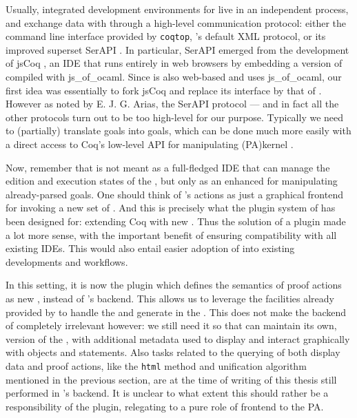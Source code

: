 Usually, integrated development environments for  live in an independent
process, and exchange data with  through a high-level communication protocol:
either the command line interface provided by \texttt{coqtop}, 's default XML
protocol, or its improved superset SerAPI .
In particular, SerAPI emerged from the development of jsCoq
, an IDE that runs entirely in web browsers by
embedding a version of  compiled with js\_of\_ocaml. Since  is also
web-based and uses js\_of\_ocaml, our first idea was essentially to fork jsCoq
and replace its interface by that of . However as noted by E. J. G. Arias,
the SerAPI protocol --- and in fact all the other protocols turn out to be too
high-level for our purpose. Typically we need to (partially) translate  goals
into  goals, which can be done much more easily with a direct access to
Coq's low-level API for manipulating \kl(PA){kernel} .

Now, remember that  is not meant as a full-fledged IDE that can manage the
edition and execution states of the , but only as an enhanced  for manipulating already-parsed goals. One should think of 's actions
as just a graphical frontend for invoking a new set of . And this is
precisely what the plugin system of  has been designed for: extending Coq
with new . Thus the solution of a  plugin made a lot more sense, with
the important benefit of ensuring compatibility with all existing IDEs. This
would also entail easier adoption of  into existing  developments and
workflows.

In this setting, it is now the  plugin which defines the semantics of proof
actions as new , instead of 's backend. This allows us to leverage
the facilities already provided by  to handle the  and generate
 in the . This does not
make the backend of  completely irrelevant however: we still need it so
that  can maintain its own,  version of the ,
with additional metadata used to display and interact graphically with objects
and statements. Also tasks related to the querying of both display data and
proof actions, like the \texttt{html} method and unification algorithm mentioned
in the previous section, are at the time of writing of this thesis still
performed in 's backend. It is unclear to what extent this should rather
be a responsibility of the  plugin, relegating  to a pure role of
frontend to the PA.

